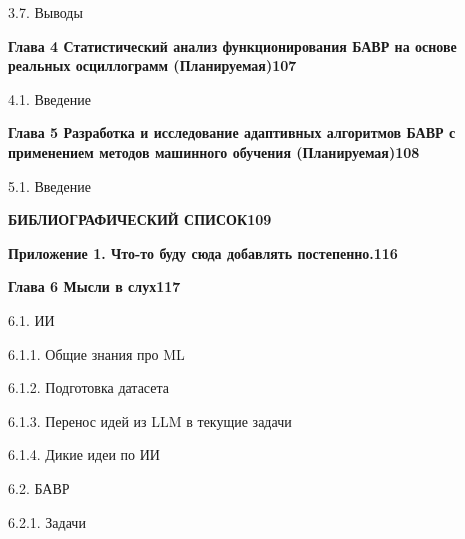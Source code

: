 \noindent\hspace*{1.5em}3.7. Выводы\par\vspace{0.5mm}
\noindent\textbf{Глава 4 Статистический анализ функционирования БАВР на основе реальных осциллограмм (Планируемая)}\dotfill\textbf{107}\par\vspace{1.5mm}
\noindent\hspace*{1.5em}4.1. Введение\par\vspace{0.5mm}
\noindent\textbf{Глава 5 Разработка и исследование адаптивных алгоритмов БАВР с применением методов машинного обучения (Планируемая)}\dotfill\textbf{108}\par\vspace{1.5mm}
\noindent\hspace*{1.5em}5.1. Введение\par\vspace{0.5mm}
\noindent\textbf{БИБЛИОГРАФИЧЕСКИЙ СПИСОК}\dotfill\textbf{109}\par\vspace{1.5mm}
\noindent\textbf{Приложение 1. Что-то буду сюда добавлять постепенно.}\dotfill\textbf{116}\par\vspace{1.5mm}
\noindent\textbf{Глава 6 Мысли в слух}\dotfill\textbf{117}\par\vspace{1.5mm}
\noindent\hspace*{1.5em}6.1. ИИ\par\vspace{0.5mm}
\noindent\hspace*{3.0em}6.1.1. Общие знания про ML\par\vspace{0.5mm}
\noindent\hspace*{3.0em}6.1.2. Подготовка датасета\par\vspace{0.5mm}
\noindent\hspace*{3.0em}6.1.3. Перенос идей из LLM в текущие задачи\par\vspace{0.5mm}
\noindent\hspace*{3.0em}6.1.4. Дикие идеи по ИИ\par\vspace{0.5mm}
\noindent\hspace*{1.5em}6.2. БАВР\par\vspace{0.5mm}
\noindent\hspace*{3.0em}6.2.1. Задачи\par\vspace{0.5mm}

\vspace{0.5cm}
